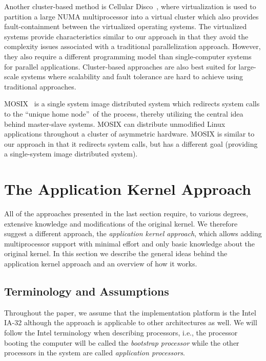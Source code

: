Another cluster-based method is Cellular Disco~\cite{govil99cellular}, where
virtualization is used to partition a large NUMA multiprocessor into a virtual
cluster which also provides fault-containment between the virtualized
operating systems. The virtualized systems provide characteristics similar to
our approach in that they avoid the complexity issues associated with a
traditional parallelization approach. However, they also require a different
programming model than single-computer systems for parallel applications.
Cluster-based approaches are also best suited for large-scale systems where
scalability and fault tolerance are hard to achieve using traditional
approaches.

MOSIX~\cite{mosix} is a single system image distributed system which redirects
system calls to the ``unique home node''~of the process, thereby utilizing the
central idea behind master-slave systems. MOSIX can distribute unmodified
Linux applications throughout a cluster of asymmetric hardware. MOSIX is
similar to our approach in that it redirects system calls, but has a different
goal (providing a single-system image distributed system).

\section{The Application Kernel Approach}

\label{sec:appkern:approach}
All of the approaches presented in the last section require, to various
degrees, extensive knowledge and modifications of the original kernel. We
therefore suggest a different approach, the \emph{application kernel
  approach}, which allows adding multiprocessor support with minimal effort
and only basic knowledge about the original kernel. In this section we
describe the general ideas behind the application kernel approach and an
overview of how it works.

\subsection{Terminology and Assumptions}
Throughout the paper, we assume that the implementation platform is the Intel
IA-32 although the approach is applicable to other architectures as well. We
will follow the Intel terminology when describing processors, i.e., the
processor booting the computer will be called the \emph{bootstrap processor}
while the other processors in the system are called \emph{application
  processors}.

